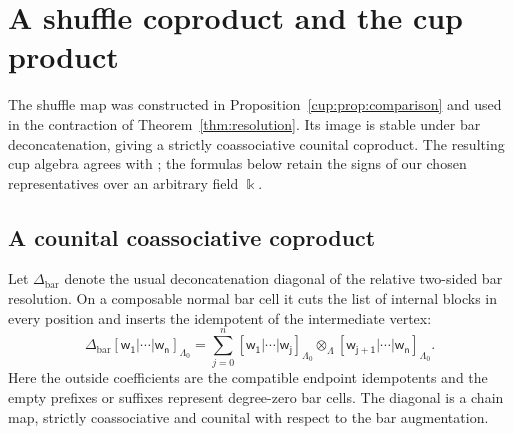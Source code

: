 \documentclass[a4paper,11pt,oneside,reqno]{amsart}
\theoremstyle{definition}
\numberwithin{equation}{section}
\begin{document}
	
\section{A shuffle coproduct and the cup product}\label{cup:sec}
The shuffle map was constructed in Proposition~\ref{cup:prop:comparison}
and used in the contraction of Theorem~\ref{thm:resolution}.
Its image is stable under bar deconcatenation, giving a strictly
coassociative counital coproduct. The resulting cup algebra agrees
with \cite[Theorem~4.2]{LiXuChen}; the formulas below retain the signs
of our chosen representatives over an arbitrary field $\Bbbk$.

\subsection{A counital coassociative coproduct}

Let $\Delta_{\mathrm{bar}}$ denote the usual deconcatenation diagonal
of the relative two-sided bar resolution. On a composable normal
bar cell it cuts the list of internal blocks in every position and
inserts the idempotent of the intermediate vertex:
\begin{equation}\label{cup:eq:bar-deconcatenation}
 \Delta_{\mathrm{bar}}\mathsf{[w_1|\cdots|w_n]}_{\Lambda_0}
 =\sum_{j=0}^n
 \mathsf{[w_1|\cdots|w_j]}_{\Lambda_0}
 \otimes_\Lambda
 \mathsf{[w_{j+1}|\cdots|w_n]}_{\Lambda_0}.
\end{equation}
Here the outside coefficients are the compatible endpoint idempotents
and the empty prefixes or suffixes represent degree-zero bar cells.
The diagonal is a chain map, strictly coassociative and counital
with respect to the bar augmentation.
\end{document}
